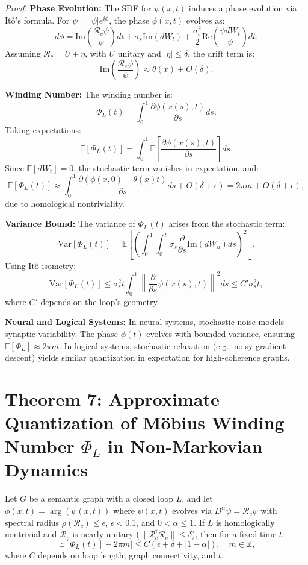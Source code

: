 \documentclass[12pt]{article}
\begin{document}
\begin{proof}

\textbf{Phase Evolution:} The SDE for $\psi(x,t)$ induces a phase evolution via Itô’s formula. For $\psi = |\psi| e^{i\phi}$, the phase $\phi(x,t)$ evolves as:
$$
d\phi = \text{Im}\left( \frac{\mathcal{R}_c \psi}{\psi} \right) dt + \sigma_s \text{Im}(dW_t) + \frac{\sigma_s^2}{2} \text{Re}\left( \frac{\psi dW_t}{\psi} \right) dt.
$$
Assuming $\mathcal{R}_c = U + \eta$, with $U$ unitary and $|\eta| \leq \delta$, the drift term is:
$$
\text{Im}\left( \frac{\mathcal{R}_c \psi}{\psi} \right) \approx \theta(x) + O(\delta).
$$

\textbf{Winding Number:} The winding number is:
$$
\Phi_L(t) = \int_0^1 \frac{\partial \phi(x(s),t)}{\partial s} ds.
$$
Taking expectations:
$$
\mathbb{E}[\Phi_L(t)] = \int_0^1 \mathbb{E}\left[ \frac{\partial \phi(x(s),t)}{\partial s} \right] ds.
$$
Since $\mathbb{E}[dW_t] = 0$, the stochastic term vanishes in expectation, and:
$$
\mathbb{E}[\Phi_L(t)] \approx \int_0^1 \frac{\partial (\phi(x,0) + \theta(x)t)}{\partial s} ds + O(\delta + \epsilon) = 2\pi m + O(\delta + \epsilon),
$$
due to homological nontriviality.

\textbf{Variance Bound:} The variance of $\Phi_L(t)$ arises from the stochastic term:
$$
\text{Var}[\Phi_L(t)] = \mathbb{E}\left[ \left( \int_0^1 \int_0^t \sigma_s \frac{\partial}{\partial s} \text{Im}(dW_u) ds \right)^2 \right].
$$
Using Itô isometry:
$$
\text{Var}[\Phi_L(t)] \leq \sigma_s^2 t \int_0^1 \left\| \frac{\partial}{\partial s} \psi(x(s),t) \right\|^2 ds \leq C' \sigma_s^2 t,
$$
where $C'$ depends on the loop’s geometry.

\textbf{Neural and Logical Systems:} In neural systems, stochastic noise models synaptic variability. The phase $\phi(t)$ evolves with bounded variance, ensuring $\mathbb{E}[\Phi_L] \approx 2\pi m$. In logical systems, stochastic relaxation (e.g., noisy gradient descent) yields similar quantization in expectation for high-coherence graphs.

\end{proof}
\section*{Theorem 7: Approximate Quantization of Möbius Winding Number \(\Phi_L\) in Non-Markovian Dynamics}
\begin{theorem}
Let \(G\) be a semantic graph with a closed loop \(L\), and let \(\phi(x,t) = \arg(\psi(x,t))\) where \(\psi(x,t)\) evolves via \(D^\alpha \psi = \mathcal{R}_c \psi\) with spectral radius \(\rho(\mathcal{R}_c) \leq \epsilon\), \(\epsilon < 0.1\), and \(0 < \alpha \leq 1\). If \(L\) is homologically nontrivial and \(\mathcal{R}_c\) is nearly unitary (\(\|\mathcal{R}_c^\dagger \mathcal{R}_c\| \leq \delta\)), then for a fixed time \(t\):
\[
\left| \mathbb{E}[\Phi_L(t)] - 2\pi m \right| \leq C (\epsilon + \delta + |1 - \alpha|), \quad m \in \mathbb{Z},
\]
where \(C\) depends on loop length, graph connectivity, and \(t\).
\end{theorem}
\end{document}
